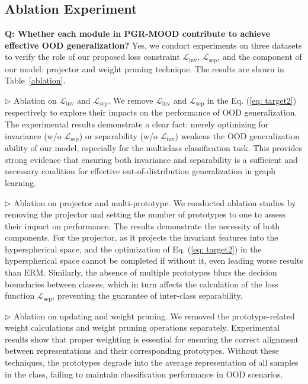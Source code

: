 \subsection{Ablation Experiment}
\textbf{Q: Whether each module in PGR-MOOD contribute to achieve effective OOD generalization?} Yes, we conduct experiments on three datasets to verify the role of our proposed loss constraint $\mathcal{L}_{\mathrm{inv}}$, $\mathcal{L}_{\mathrm{sep}}$, and the component of our model: projector and weight pruning technique. The results are shown in Table~\ref{ablation}.

\noindent$\rhd$ \textsf{Ablation on $\mathcal{L}_{\mathrm{inv}}$ and $\mathcal{L}_{\mathrm{sep}}$.}
 We remove $\mathcal{L}_{\mathrm{inv}}$ and $\mathcal{L}_{\mathrm{sep}}$ in the Eq. (\ref{eq: target2}) respectively to explore their impacts on the performance of OOD generalization. The experimental results demonstrate a clear fact: merely optimizing  for invariance (w/o $\mathcal{L}_{\mathrm{sep}}$) or separability (w/o $\mathcal{L}_{\mathrm{inv}}$) weakens the OOD generalization ability of our model, especially for the multiclass classification task. This provides strong evidence that ensuring both invariance and separability is a sufficient and necessary condition for effective out-of-distribution generalization in graph learning.

 \noindent$\rhd$ \textsf{Ablation on projector and multi-prototype.}
We conducted ablation studies by removing the projector and setting the number of prototypes to one to assess their impact on performance. The results demonstrate the necessity of both components. For the projector, as it projects the invariant features into the hyperspherical space, and the optimization of Eq. (\ref{eq: target2}) in the hyperspherical space cannot be completed if without it, even leading worse results than ERM. Similarly, the absence of multiple prototypes blurs the decision boundaries between classes, which in turn affects the calculation of the loss function $\mathcal{L}_{\mathrm{sep}}$, preventing the guarantee of inter-class separability.

 \noindent$\rhd$ \textsf{Ablation on updating and weight pruning.}
We removed the prototype-related weight calculations and weight pruning operations separately. Experimental results show that proper weighting is essential for ensuring the correct alignment between representations and their corresponding prototypes. Without these techniques, the prototypes degrade into the average representation of all samples in the class, failing to maintain classification performance in OOD scenarios.

